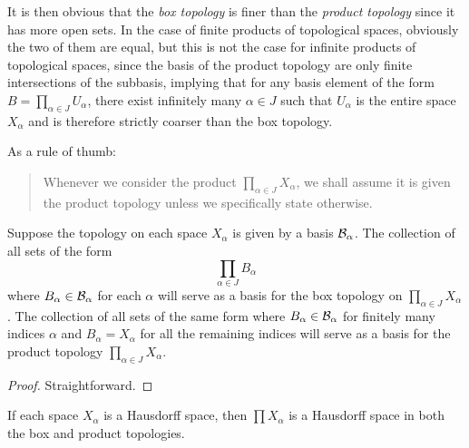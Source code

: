 It is then obvious that the \textit{box topology} is finer than the \textit{product topology} since it has more open sets. In the case of finite products of topological spaces, obviously the two of them are equal, but this is not the case for infinite products of topological spaces, since the basis of the product topology are only finite intersections of the subbasis, implying that for any basis element of the form $B = \prod_{\alpha\in J}U_\alpha$, there exist infinitely many $\alpha\in J$ such that $U_\alpha$ is the entire space $X_\alpha$ and is therefore strictly coarser than the box topology.

As a rule of thumb:
\begin{quotation}
    Whenever we consider the product $\prod_{\alpha\in J}X_\alpha$, we shall assume it is given the product topology unless we specifically state otherwise.
\end{quotation}

\begin{theorem}
    Suppose the topology on each space $X_\alpha$ is given by a basis $\mathcal{B}_\alpha$. The collection of all sets of the form 
    \begin{equation*}
        \prod_{\alpha\in J}B_\alpha
    \end{equation*}
    where $B_\alpha\in\mathcal{B}_\alpha$ for each $\alpha$ will serve as a basis for the box topology on $\prod_{\alpha\in J}X_\alpha$. The collection of all sets of the same form where $B_\alpha\in\mathcal{B}_\alpha$ for finitely many indices $\alpha$ and $B_\alpha = X_\alpha$ for all the remaining indices will serve as a basis for the product topology $\prod_{\alpha\in J}X_\alpha$.
\end{theorem}
\begin{proof}
    Straightforward.
\end{proof}

\begin{theorem}
    If each space $X_\alpha$ is a Hausdorff space, then $\prod X_\alpha$ is a Hausdorff space in both the box and product topologies.
\end{theorem}

